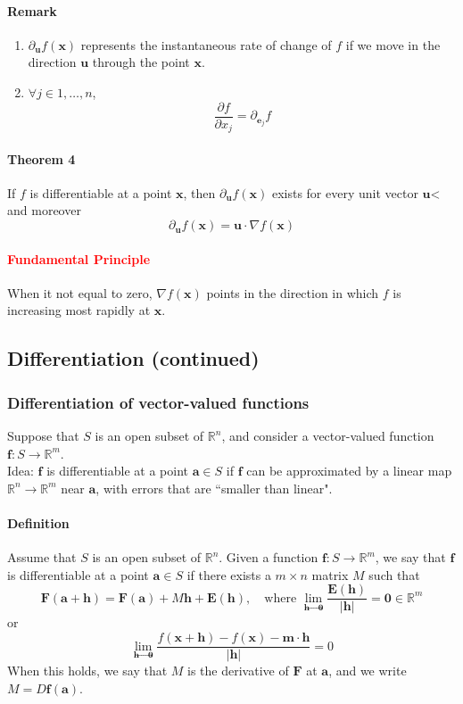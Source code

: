 \documentclass[11pt]{article}
\newcommand{\tb}[1]{\textbf{#1}}
\newcommand{\real}[0]{\mathbb{R}}
\newcommand{\vx}[0]{\tb{x}}
\newcommand{\vo}[0]{\tb{0}}
\newcommand{\va}[0]{\tb{a}}
\newcommand{\ve}[0]{\tb{e}}
\newcommand{\vm}[0]{\tb{m}}
\newcommand{\vh}[0]{\tb{h}}
\newcommand{\vf}[0]{\tb{F}}
\newcommand{\vu}[0]{\tb{u}}
\newcommand{\ff}[0]{\tb{f}}
\newcommand{\p}[0]{\partial}
\begin{document}
\paragraph{Remark}
\begin{enumerate}
	\item $\p_\vu f(\vx)$ represents the instantaneous rate of change of $f$ if we move in the direction $\vu$ through the point $\vx$.
	\item $\forall j \in {1, \hdots, n}$, $$\frac{\p f}{\p x_j} = \p_{\ve_j}f$$
\end{enumerate}
\paragraph{Theorem 4} If $f$ is differentiable at a point $\vx$, then $\p_\vu f(\vx)$ exists for every unit vector $\vu$< and moreover 
$$\p_\vu f(\vx) = \vu \cdot \nabla f(\vx)$$
\paragraph{\textcolor{red}{Fundamental Principle}} When it not equal to zero, $\nabla f(\vx)$ points in the direction in which $f$ is increasing most rapidly at $\vx$. 
\subsection{Differentiation (continued)}
\subsubsection{Differentiation of vector-valued functions}
Suppose that $S$ is an open subset of $\real^n$, and consider a vector-valued function $\tb{f}: S \rightarrow \real^m$. \\
Idea: $\tb{f}$ is differentiable at a point $\va \in S$ if $\ff$ can be approximated by a linear map $\real^n \rightarrow \real^m$ near $\va$, with errors that are ``smaller than linear".
\paragraph{Definition} Assume that $S$ is an open subset of $\real^n$. Given a function $\ff: S \rightarrow \real^m$, we say that $\ff$ is differentiable at a point $\va \in S$ if there exists a $m \times n$ matrix $M$ such that 
$$\vf(\va + \vh) = \vf(\va) + M\vh + \tb{E}(\vh), \quad \mbox{where } \underset{\vh \rightarrow \vo}{\lim} \frac{\tb{E}(\vh)}{|\vh|} = \vo \in \real^m$$
or
$$ \underset{\vh \rightarrow \vo}{\lim} \frac{f(\vx + \vh) - f(\vx) - \vm\cdot \vh}{|\vh|} = 0$$
When this holds, we say that $M$ is the derivative of $\vf$ at $\va$, and we write $M = D\ff(\va)$.
\end{document}

